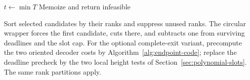 \begin{algorithm}[H]
\caption{\SlotDP: exact interval deadlines with a rank subset}
\label{alg:slot-dp}
$t\gets\min T$\;
Memoize and return infeasible\;
\end{algorithm}

Sort selected candidates by their ranks and suppress unused ranks.
The circular wrapper forces the first candidate, cuts there, and
subtracts one from surviving deadlines and the slot cap.
For the optional complete-exit variant, precompute the two oriented
decoder costs by Algorithm~\ref{alg:endpoint-code}; replace the deadline
precheck by the two local height tests of
Section~\ref{sec:polynomial-slots}. The same rank partitions apply.
